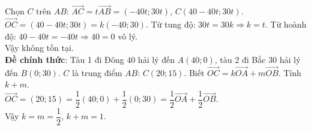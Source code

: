 \begin{bt}
{		Chọn $C$ trên $AB$: $\overrightarrow{AC}=t\overrightarrow{AB}=(-40t;30t)$, $C(40-40t;30t)$. \\
		$\overrightarrow{OC}=(40-40t;30t)=k(-40;30)$. Từ tung độ: $30t=30k\Rightarrow k=t$. Từ hoành độ: $40-40t=-40t\Rightarrow 40=0$ vô lý. \\
		Vậy không tồn tại. \\
		\textbf{Đề chính thức}: Tàu 1 đi Đông $40$ hải lý đến $A(40;0)$, tàu 2 đi Bắc $30$ hải lý đến $B(0;30)$. $C$ là trung điểm $AB$: $C(20;15)$. Biết $\overrightarrow{OC}=k\overrightarrow{OA}+m\overrightarrow{OB}$. Tính $k+m$. \\
		$\overrightarrow{OC}=(20;15)=\dfrac{1}{2}(40;0)+\dfrac{1}{2}(0;30)=\dfrac{1}{2}\overrightarrow{OA}+\dfrac{1}{2}\overrightarrow{OB}$. \\
		Vậy $k=m=\dfrac{1}{2}$, $k+m=1$.
	}
	
\end{bt}

